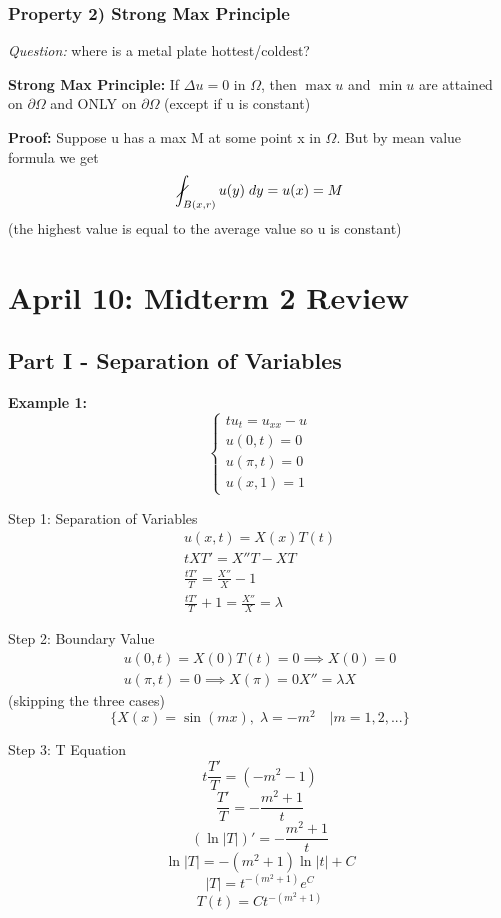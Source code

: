\documentclass[12pt]{article}
\newcommand{\slashedint}{\diagup \!\!\!\!\!\!\! \int}
\begin{document}
\subsubsection{Property 2) Strong Max Principle}
\emph{Question:} where is a metal plate hottest/coldest?

\textbf{Strong Max Principle:} 
If $\Delta u =0$ in $\Omega$, then $\max u$ and $\min u$ are attained on $\partial \Omega$ and ONLY on $\partial \Omega$
(except if u is constant)

\textbf{Proof:} Suppose u has a max M at some point x in $\Omega$. But by mean value formula we get 
\[\slashedint_{B(x, r)} u(y)\; dy = u(x) = M\]
(the highest value is equal to the average value so u is constant)

\section{April 10: Midterm 2 Review}
\subsection*{Part I - Separation of Variables}
\textbf{Example 1:}
\[\begin{cases*}
    tu_t = u_{xx} - u\\
    u(0, t) = 0\\
    u(\pi, t) = 0\\
    u(x, 1) = 1
\end{cases*}\]

Step 1: Separation of Variables
\begin{gather*}
    u(x, t) = X(x)T(t)\\
    tXT' = X''T - XT\\
    \frac{tT'}{T} = \frac{X''}{X} - 1\\
    \frac{tT'}{T} + 1 = \frac{X''}{X} = \lambda 
\end{gather*}

Step 2: Boundary Value 
\begin{gather*}
    u(0, t) = X(0)T(t) = 0 \implies X(0) = 0\\
    u(\pi, t) = 0\implies X(\pi) = 0
    X'' = \lambda X
\end{gather*}
(skipping the three cases)
\[\{X(x) = \sin(mx), \; \lambda = -m^2 \quad | m = 1, 2, ...\}\]

Step 3: T Equation 
\[t\frac{T'}{T} = (-m^2 - 1)\]
\[\frac{T'}{T} = -\frac{m^2 + 1}{t}\]
\[(\ln|T|)' = - \frac{m^2 + 1}{t}\]
\[\ln|T| = -(m^2 + 1)\ln|t| + C\]
\[|T| = t^{-(m^2 + 1)}e^C\]
\[T(t) = Ct^{-(m^2 + 1)}\]
\end{document}
